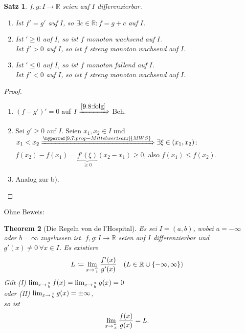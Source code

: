\documentclass{extreport}
\newcommand{\R}{\mathbb{R}}
\theoremstyle{named}
\newtheorem{namedtheorem}{Theorem} \counterwithin{namedtheorem}{chapter}
\theoremstyle{dotless}
\newtheorem{satz}[namedtheorem]{Satz}
\begin{document}
\begin{satz} \label{9.10:satz}
	$f, g \colon I \rightarrow \R$ seien auf $I$ differenzierbar.
	\begin{enumerate}
		\item Ist $f' = g'$ auf $I$, so $\exists c \in \R: f = g + c$ auf $I$.
		\item Ist $' \geq 0$ auf $I$, so ist $f$ monoton wachsend auf $I$. \\
				Ist $f' > 0$ auf $I$, so ist $f$ streng monoton wachsend auf $I$.
		\item Ist $' \leq 0$ auf $I$, so ist $f$ monoton fallend auf $I$. \\
				Ist $f' < 0$ auf $I$, so ist $f$ streng monoton wachsend auf $I$.
	\end{enumerate}
\end{satz}

\begin{proof}  ~\
	\begin{enumerate}
		\item $(f - g')' = 0$ auf $I \xRightarrow[]{\ref{9.8:folg}}$ Beh.
		\item Sei $g' \geq 0$ auf $I$. Seien $x_{1}, x_{2} \in I$ und $x_{1} < x_{2} \xRightarrow[]{\hyperref[9.7:prop-Mittelwertsatz]{MWS}} \exists \xi \in (x_{1}, x_{2})$: $f(x_{2}) - f(x_{1}) = \underbrace{f'(\xi)}_{\geq 0} (x_{2} - x_{1}) \geq 0$, also $f(x_{1}) \leq f(x_{2})$.
		\item Analog zur b).
	\end{enumerate}
\end{proof}

Ohne Beweis:
\begin{namedtheorem}[Die Regeln von de l'Hospital] \label{9.11:prop:lHopital}
	Es sei $I = (a, b)$, wobei $a = -\infty$ oder $b = \infty$ zugelassen ist. $f, g \colon I \rightarrow \R$ seien auf $I$ differenzierbar und $g'(x) \neq 0 ~\forall x \in I$. Es existiere
	$$ L \coloneqq \lim_{x \rightarrow {a \above 0pt b}} \frac{f'(x)}{g'(x)} \quad  (L \in \R \cup \{ - \infty, \infty \}) $$
	Gilt (I) $\lim_{x \rightarrow {a \above 0pt b}} f(x) = \lim_{x \rightarrow {a \above 0pt b}} g(x) = 0$ \\
	oder (II) $\lim_{x \rightarrow {a \above 0pt b}} g(x) = \pm \infty$, \\
	so ist 
	$$ \lim_{x \rightarrow {a \above 0pt b}} \frac{f(x)}{g(x)} = L. $$
\end{namedtheorem}
\end{document}
